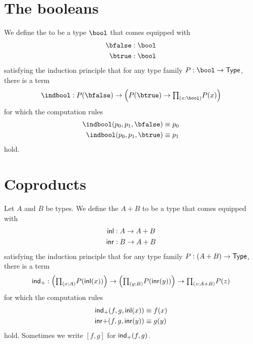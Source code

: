 \section{The booleans}
\begin{defn}
We define the  to be a type $\bool$ that comes equipped with
\begin{align*}
\bfalse & : \bool \\
\btrue & : \bool
\end{align*}
satisfying the induction principle that for any type family $P:\bool\to\type$, there is a term
\begin{equation*}
\indbool : P(\bfalse)\to \Big(P(\btrue)\to \prd{x:\bool}P(x)\Big)
\end{equation*}
for which the computation rules
\begin{align*}
\indbool(p_0,p_1,\bfalse) & \jdeq p_0 \\
\indbool(p_0,p_1,\btrue) & \jdeq p_1
\end{align*}
hold.
\end{defn}

\section{Coproducts}
\begin{defn}
Let $A$ and $B$ be types. We define the  $A+B$ to be a type that comes equipped with
\begin{align*}
{\mathsf{inl}} & : A \to A+B \\
{\mathsf{inr}} & : B \to A+B
\end{align*}
satisfying the induction principle that for any type family $P:(A+B)\to\mathsf{Type}$, there is a term
\begin{equation*}
\ind{+} : \Big(\prd{x:A}P(\inl(x))\Big)\to\Big(\prd{y:B}P(\inr(y))\Big)\to\prd{z:A+B}P(z)
\end{equation*}
for which the computation rules
\begin{align*}
\mathsf{ind}_{+}(f,g,{\mathsf{inl}}(x)) & \equiv f(x) \\
{\mathsf{inr}}{+}(f,g,{\mathsf{inr}}(y)) & \equiv g(y)
\end{align*}
hold. Sometimes we write $[f,g]$ for $\mathsf{ind}_{+}(f,g)$.
\end{defn}

